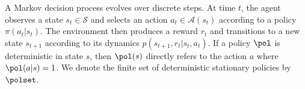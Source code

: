 A Markov decision process evolves over discrete steps.
At time \(t\), the agent observes a state \(s_t \in \mathcal S\) and selects an action \(a_t \in \mathcal A(s_t)\) according to a policy \(\pi(a_t | s_t)\).
The environment then produces a reward \(r_t\) and transitions to a new state \(s_{t+1}\) according to its dynamics $p(s_{t+1}, r_t | s_t, a_t)$.
If a policy $\pol$ is deterministic in state $s$, then $\pol(s)$ directly refers to the action $a$ where $\pol(a | s) = 1$.
We denote the finite set of deterministic stationary policies by $\polset$.





